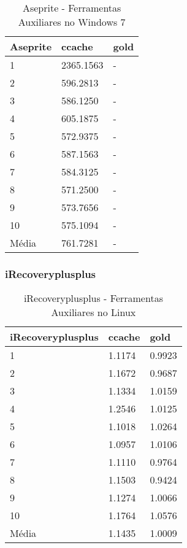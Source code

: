 \begin{table}[!ht]
\centering
\caption{Aseprite - Ferramentas Auxiliares no Windows 7}
\label{tab:ferramentas_auxliares:windows:aseprite}
\begin{tabular}{lll}
\textbf{Aseprite} & \textbf{ccache} &  \textbf{gold}  \\ \toprule
1                 & 2365.1563       &  -    \\ 
2                 & 596.2813        &  -    \\ 
3                 & 586.1250        &  -    \\ 
4                 & 605.1875        &  -    \\ 
5                 & 572.9375        &  -    \\ 
6                 & 587.1563        &  -    \\ 
7                 & 584.3125        &  -    \\ 
8                 & 571.2500        &  -    \\ 
9                 & 573.7656        &  -    \\ 
10                & 575.1094        &  -    \\ \bottomrule
Média             & 761.7281        &  -    \\ 
\end{tabular}
\end{table}

\clearpage
\subsubsection*{iRecoveryplusplus}

\begin{table}[!ht]
\centering
\caption{iRecoveryplusplus - Ferramentas Auxiliares no Linux}
\label{tab:ferramentas_auxliares:linux:irecoveryplusplus}
\begin{tabular}{lll}
\textbf{iRecoveryplusplus} & \textbf{ccache} &  \textbf{gold}  \\ \toprule
1           & 1.1174 &  0.9923    \\ 
2           & 1.1672 &  0.9687    \\ 
3           & 1.1334 &  1.0159    \\ 
4           & 1.2546 &  1.0125    \\ 
5           & 1.1018 &  1.0264    \\ 
6           & 1.0957 &  1.0106    \\ 
7           & 1.1110 &  0.9764    \\ 
8           & 1.1503 &  0.9424    \\ 
9           & 1.1274 &  1.0066    \\ 
10          & 1.1764 &  1.0576    \\ \bottomrule
Média       & 1.1435 &  1.0009    \\ 
\end{tabular}
\end{table}

